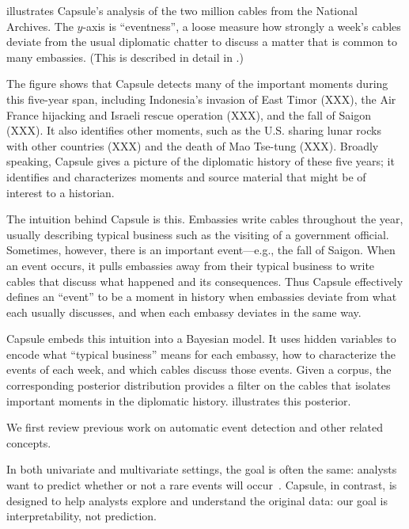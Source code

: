  illustrates Capsule's analysis of the two
million cables from the National Archives. The $y$-axis is
``eventness'', a loose measure how strongly a week's cables deviate
from the usual diplomatic chatter to discuss a matter that is common
to many embassies. (This is described in detail in \Cref{}.)

The figure shows that Capsule detects many of the important moments
during this five-year span, including Indonesia's invasion of East
Timor (XXX), the Air France hijacking and Israeli rescue operation
(XXX), and the fall of Saigon (XXX). It also identifies other moments,
such as the U.S. sharing lunar rocks with other countries (XXX) and
the death of Mao Tse-tung (XXX). Broadly speaking, Capsule gives a
picture of the diplomatic history of these five years; it identifies
and characterizes moments and source material that might be of
interest to a historian.

The intuition behind Capsule is this. Embassies write cables
throughout the year, usually describing typical business such as the
visiting of a government official. Sometimes, however, there is an
important event---e.g., the fall of Saigon. When an event occurs, it
pulls embassies away from their typical business to write cables that
discuss what happened and its consequences. Thus Capsule effectively
defines an ``event'' to be a moment in history when embassies deviate
from what each usually discusses, and when each embassy deviates in
the same way.

Capsule embeds this intuition into a Bayesian model. It uses hidden
variables to encode what ``typical business'' means for each embassy,
how to characterize the events of each week, and which cables discuss
those events. Given a corpus, the corresponding posterior distribution
provides a filter on the cables that isolates important moments in the
diplomatic history.  illustrates this
posterior.



 We first review previous work on automatic
event detection and other related concepts.

In both univariate and multivariate settings, the goal is often the same: analysts want to predict whether or not a rare events will occur~\cite{weiss1998learning,das2008anomaly}.  Capsule, in contrast, is designed to help analysts explore and understand the original data: our goal is interpretability, not prediction.

